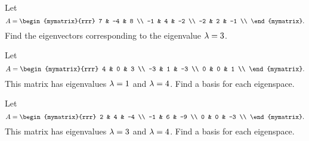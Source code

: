 \begin{ex}
  Let
  \begin{equation*}
    A = \begin{mymatrix}{rrr}
      7 &  -4 &   8 \\
      -1 &  4 &  -2 \\
      -2 &  2 &  -1 \\
    \end{mymatrix}.
  \end{equation*}
  Find the eigenvectors corresponding to the eigenvalue $\lambda=3$.
\end{ex}

\begin{ex}
  Let
  \begin{equation*}
    A = \begin{mymatrix}{rrr}
      4 &   0 &   3 \\
      -3 &   1 &  -3 \\
      0 &   0 &   1 \\
    \end{mymatrix}.
  \end{equation*}
  This matrix has eigenvalues $\lambda=1$ and $\lambda=4$. Find a
  basis for each eigenspace.
\end{ex}

\begin{ex}
  Let
  \begin{equation*}
    A = \begin{mymatrix}{rrr}
      2 &   4 &  -4 \\
      -1 &  6 &  -9 \\
      0 &   0 &  -3 \\
    \end{mymatrix}.
  \end{equation*}
  This matrix has eigenvalues $\lambda=3$ and $\lambda=4$. Find a
  basis for each eigenspace.
\end{ex}

